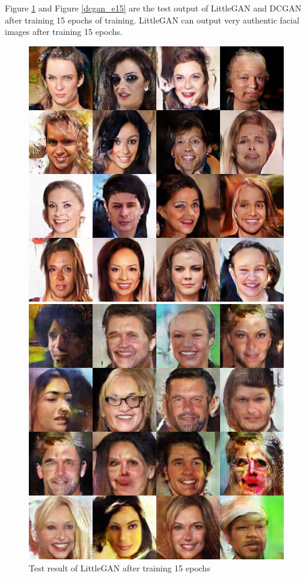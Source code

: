 Figure \ref{littlegan_e15} and Figure \ref{dcgan_e15} are the test output of LittleGAN and DCGAN after training 15 epochs of training.
LittleGAN can output very authentic facial images after training 15 epochs.

\begin{figure}
    \begin{minipage}[t]{0.48\linewidth}
        \centering
        \includegraphics[width=\textwidth]{figures/result_littlegan_e15.png}
        \caption{Test result of LittleGAN after training 15 epochs}
        \label{littlegan_e15}
    \end{minipage}
        \hfill
    \begin{minipage}[t]{0.48\linewidth}
        \centering
        \includegraphics[width=\textwidth]{figures/result_dcgan_e15.png}

\end{minipage}
\end{figure}
